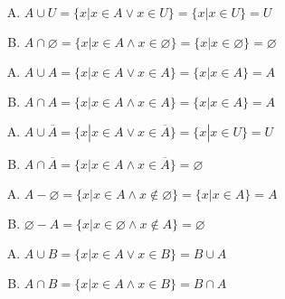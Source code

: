 {{        %
        \begin{practices}
            \begin{enumerate}[A.]
                \item $A \cup U = \{x | x \in A \vee x \in U\} = \{x | x \in U\} = U$
                \item $A \cap \varnothing = \{x | x \in A \wedge x \in \varnothing\} = \{x | x \in \varnothing\} = \varnothing$
            \end{enumerate}
        \end{practices}

        \begin{practices}
            \begin{enumerate}[A.]
                \item $A \cup A = \{x | x \in A \vee x \in A\} = \{x | x \in A\} = A$
                \item $A \cap A = \{x | x \in A \wedge x \in A\} = \{x | x \in A\} = A$
            \end{enumerate}
        \end{practices}

        \begin{practices}
            \begin{enumerate}[A.]
                \item $A \cup \overline{A} = \{x | x \in A \vee x \in \overline{A}\} = \{x | x \in U\} = U$
                \item $A \cap \overline{A} = \{x | x \in A \wedge x \in \overline{A}\} = \varnothing$
            \end{enumerate}
        \end{practices}

        \begin{practices}
            \begin{enumerate}[A.]
                \item $A - \varnothing = \{x | x \in A \wedge x \notin \varnothing\} = \{x | x \in A\} = A$
                \item $\varnothing - A = \{x | x \in \varnothing \wedge x \notin A\} = \varnothing$
            \end{enumerate}
        \end{practices}

        \begin{practices}
            \begin{enumerate}[A.]
                \item $A \cup B = \{x | x \in A \vee x \in B\} = B \cup A$
                \item $A \cap B = \{x | x \in A \wedge x \in B\} = B \cap A$
            \end{enumerate}
        \end{practices}

}}
